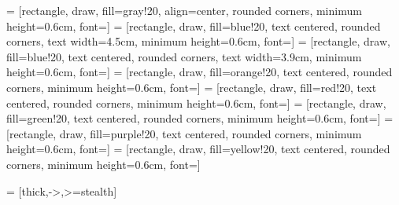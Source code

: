  = [rectangle, draw, fill=gray!20, align=center, rounded corners, minimum height=0.6cm, font=\small]
 = [rectangle, draw, fill=blue!20, text centered, rounded corners, text width=4.5cm, minimum height=0.6cm, font=\small]
 = [rectangle, draw, fill=blue!20, text centered, rounded corners, text width=3.9cm, minimum height=0.6cm, font=\small]
 = [rectangle, draw, fill=orange!20, text centered, rounded corners, minimum height=0.6cm, font=\small]
 = [rectangle, draw, fill=red!20, text centered, rounded corners, minimum height=0.6cm, font=\small]
 = [rectangle, draw, fill=green!20, text centered, rounded corners, minimum height=0.6cm, font=\small]
 = [rectangle, draw, fill=purple!20, text centered, rounded corners, minimum height=0.6cm, font=\small]
 = [rectangle, draw, fill=yellow!20, text centered, rounded corners, minimum height=0.6cm, font=\small]

 = [thick,->,>=stealth]

